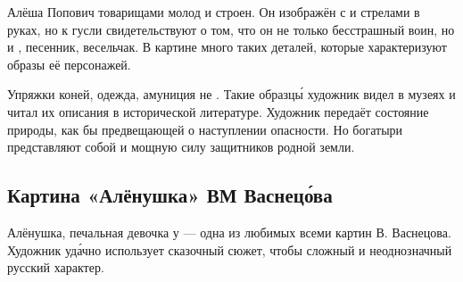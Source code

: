 Алёша Попович  товарищами молод и строен. Он изображён с  и стрелами в руках, но  к  гусли свидетельствуют о том, что он не только бесстрашный воин, но и , песенник, весельчак. В картине много таких деталей, которые характеризуют образы её персонажей.

Упряжки коней, одежда, амуниция не . Такие образц\'{ы} художник видел в музеях и читал их описания в исторической литературе. Художник  передаёт состояние природы, как бы предвещающей о наступлении опасности. Но богатыри представляют собой  и мощную силу защитников родной земли.




\subsection{Картина «Алёнушка» ВМ Васнец\'{о}ва}

Алёнушка, печальная девочка у  --- одна из любимых всеми картин В. Васнецова. Художник уд\'{а}чно использует сказочный сюжет, чтобы  сложный и неоднозначный русский характер.

